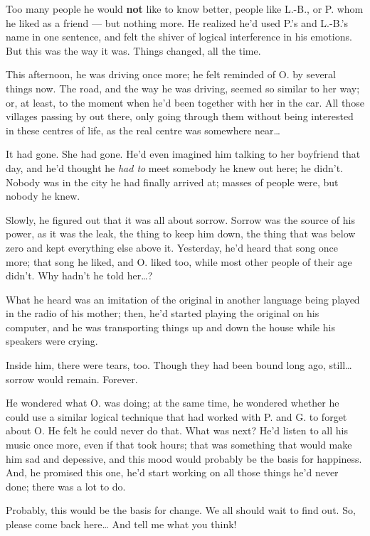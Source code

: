 Too many people he would \textbf{not} like to know better, people like L.-B., or P. whom he liked as a friend --- but nothing more. 
He realized he'd used P.'s and L.-B.'s name in one sentence, and felt the shiver of logical interference in his emotions. 
But this was the way it was. Things changed, all the time.

This afternoon, he was driving once more; he felt reminded of O. by several things now. The road, and the way he was driving, seemed so similar to her way; or, at least, to the moment when he'd been together with her in the car. All those villages passing by out there, only going through them without being interested in these centres of life, as the real centre was somewhere near\dots{}

It had gone. She had gone. He'd even imagined him talking to her boyfriend that day, and he'd thought he \emph{had to} meet somebody he knew out here; he didn't. Nobody was in the city he had finally arrived at; masses of people were, but nobody he knew.

Slowly, he figured out that it was all about sorrow. Sorrow was the source of his power, as it was the leak, the thing to keep him down, the thing that was below zero and kept everything else above it. Yesterday, he'd heard that song once more; that song he liked, and O. liked too, while most other people of their age didn't. Why hadn't he told her\dots{}?

What he heard was an imitation of the original in another language being played in the radio of his mother; then, he'd started playing the original on his computer, and he was transporting things up and down the house while his speakers were crying.

Inside him, there were tears, too. Though they had been bound long ago, still\dots{} sorrow would remain. Forever.

He wondered what O. was doing; at the same time, he wondered whether he could use a similar logical technique that had worked with P. and G. to forget about O. He felt he could never do that. What was next? He'd listen to all his music once more, even if that took hours; that was something that would make him sad and depessive, and this mood would probably be the basis for happiness. And, he promised this one, he'd start working on all those things he'd never done; there was a lot to do.

Probably, this would be the basis for change. 
We all should wait to find out. 
So, please come back here\dots{}
And tell me what you think!


